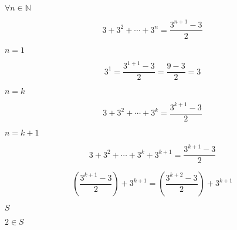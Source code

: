 \documentclass[10pt]{book}
\begin{document}
\begin{mdSnippets}
\begin{mdInlineSnippet}[775ac455dd1f9db047b23c9a57b437ac]%
$ \forall n \in \mathbb{N} $\end{mdInlineSnippet}%
\begin{mdDisplaySnippet}[7cd1e16d1f92476019233df7311bce8b]%
\[%
3 + 3^2 + \cdots + 3^n = \frac {3^{n+1} - 3} {2}
\]%
\end{mdDisplaySnippet}%
\begin{mdInlineSnippet}[ab78ccfbcd04b1ba22eb9427251cb20d]%
$n = 1$\end{mdInlineSnippet}%
\begin{mdDisplaySnippet}[a1f851db0ec848fc4d0e5a373cb2d682]%
\[%
3^1 = \frac {3^{1+1}-3} {2} = \frac {9-3} {2} = 3
\]%
\end{mdDisplaySnippet}%
\begin{mdInlineSnippet}[dc36071f824776cfcf54b119f4c1a163]%
$n = k$\end{mdInlineSnippet}%
\begin{mdDisplaySnippet}[e7a77b54672660e11e99338cf9752f92]%
\[%
3 + 3^2 + \cdots + 3^k = \frac {3^{k+1} - 3} {2}
\]%
\end{mdDisplaySnippet}%
\begin{mdInlineSnippet}[6db118b1df7f9211c7324569b51daf21]%
$n = k+1$\end{mdInlineSnippet}%
\begin{mdDisplaySnippet}%
\[%
3 + 3^2 + \cdots + 3^k + 3^{k+1}= \frac {3^{k+1} - 3} {2} 
\]%
\end{mdDisplaySnippet}%
\begin{mdDisplaySnippet}%
\[%
(\frac {3^{k+1} - 3} {2}) + 3^{k+1} = (\frac {3^{k+2}-3} {2}) + 3^{k+1}
\]%
\end{mdDisplaySnippet}%
\begin{mdInlineSnippet}%
$S$\end{mdInlineSnippet}%
\begin{mdInlineSnippet}[ba74dc2b31a4680933b0bd1e5bcbd11a]%
$2\in S$\end{mdInlineSnippet}%

\end{mdSnippets}
\end{document}
